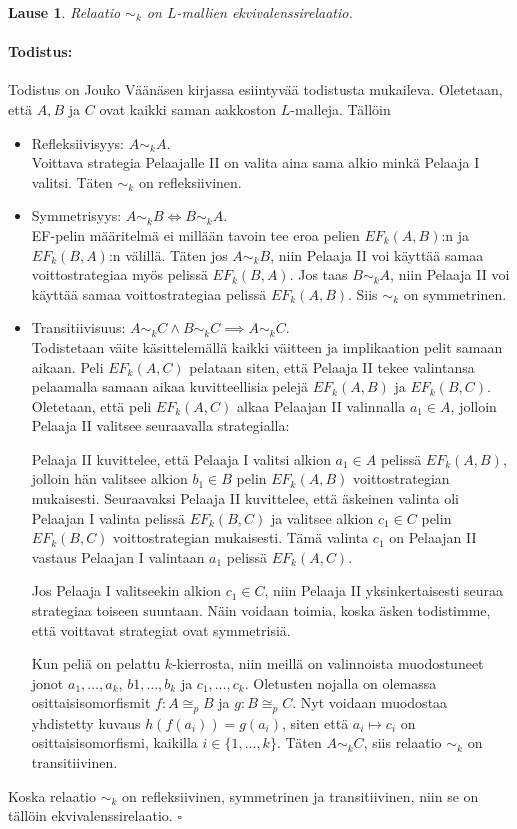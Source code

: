 \documentclass[finnish]{tktltiki2}
\newtheorem{lau}{Lause}
\theoremstyle{definition}
\theoremstyle{remark}
\newenvironment{tod}{\paragraph{Todistus:}}{\hfill$\square$}
\begin{document}
\begin{lau} 
Relaatio $\sim_k$ on $L$-mallien ekvivalenssirelaatio.
\end{lau}
\begin{tod} Todistus on Jouko Väänäsen kirjassa \cite{Vaa11} esiintyvää todistusta mukaileva. Oletetaan, että $A, B$ ja $C$ ovat kaikki saman aakkoston $L$-malleja. Tällöin
\begin{itemize}
\item Refleksiivisyys: $A \sim_k A$.\\
Voittava strategia Pelaajalle II on valita aina sama alkio minkä Pelaaja I valitsi. Täten $\sim_k$ on refleksiivinen.
\item Symmetrisyys: $A \sim_k B \iff B \sim_k A$.\\
EF-pelin määritelmä ei millään tavoin tee eroa pelien $EF_k(A, B)$:n ja $EF_k(B, A)$:n välillä. Täten jos $A \sim_k B$, niin Pelaaja II voi käyttää samaa voittostrategiaa myös pelissä $EF_k(B, A)$. Jos taas $B \sim_k A$, niin Pelaaja II voi käyttää samaa voittostrategiaa pelissä $EF_k(A, B)$. Siis $\sim_k$ on symmetrinen.
\item Transitiivisuus: $A \sim_k C \land B \sim_k C \implies A \sim_k C$.\\
Todistetaan väite käsittelemällä kaikki väitteen ja implikaation pelit samaan aikaan. Peli $EF_k(A, C)$ pelataan siten, että Pelaaja II tekee valintansa pelaamalla samaan aikaa kuvitteellisia pelejä $EF_k(A, B)$ ja $EF_k(B, C)$. Oletetaan, että peli $EF_k(A, C)$ alkaa Pelaajan II valinnalla $a_1 \in A$, jolloin Pelaaja II valitsee seuraavalla strategialla:

Pelaaja II kuvittelee, että Pelaaja I valitsi alkion $a_1 \in A$ pelissä $EF_k(A, B)$, jolloin hän valitsee alkion $b_1 \in B$ pelin $EF_k(A, B)$ voittostrategian mukaisesti. Seuraavaksi Pelaaja II kuvittelee, että äskeinen valinta oli Pelaajan I valinta pelissä $EF_k(B, C)$ ja valitsee alkion $c_1 \in C$ pelin $EF_k(B, C)$ voittostrategian mukaisesti. Tämä valinta $c_1$ on Pelaajan II vastaus Pelaajan I valintaan $a_1$ pelissä $EF_k(A, C)$.

Jos Pelaaja I valitseekin alkion $c_1 \in C$, niin Pelaaja II yksinkertaisesti seuraa strategiaa toiseen suuntaan. Näin voidaan toimia, koska äsken todistimme, että voittavat strategiat ovat symmetrisiä.

Kun peliä on pelattu $k$-kierrosta, niin meillä on valinnoista muodostuneet jonot $a_1, \ldots, a_k$, $b1, \ldots, b_k$ ja $c_1, \ldots, c_k$. Oletusten nojalla on olemassa osittaisisomorfismit $f: A \cong_p B$ ja $g: B \cong_p C$. Nyt voidaan muodostaa yhdistetty kuvaus $h(f(a_i)) = g(a_i)$, siten että $a_i \mapsto c_i$ on osittaisisomorfismi, kaikilla $i \in \{1, \ldots, k\}$. Täten $A \sim_k C$, siis relaatio $\sim_k$ on transitiivinen.
\end{itemize}
Koska relaatio $\sim_k$ on refleksiivinen, symmetrinen ja transitiivinen, niin se on tällöin ekvivalenssirelaatio.
\end{tod}
\\
\end{document}
